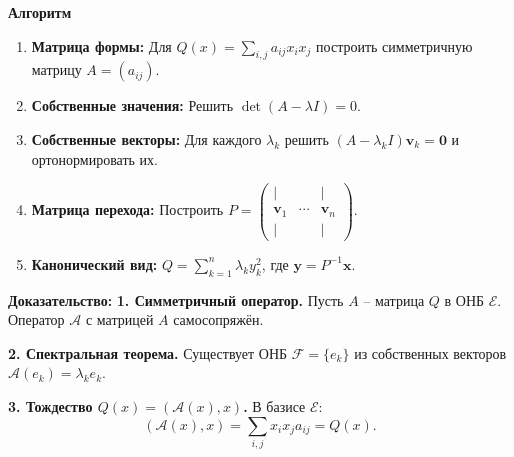 \documentclass[12pt]{article}
\begin{document}
\textbf{Алгоритм}
\begin{enumerate}
  \item \textbf{Матрица формы:} Для $Q(x) = \sum_{i,j} a_{ij}x_i x_j$ построить симметричную матрицу $A = (a_{ij})$.
  \item \textbf{Собственные значения:} Решить $\det(A - \lambda I) = 0$.
  \item \textbf{Собственные векторы:} Для каждого $\lambda_k$ решить $(A - \lambda_k I)\mathbf{v}_k = \mathbf{0}$ и ортонормировать их.
  \item \textbf{Матрица перехода:} Построить $P = \begin{pmatrix} | & & | \\ \mathbf{v}_1 & \cdots & \mathbf{v}_n \\ | & & | \end{pmatrix}$.
  \item \textbf{Канонический вид:} $Q = \sum_{k=1}^n \lambda_k y_k^2$, где $\mathbf{y} = P^{-1}\mathbf{x}$.
\end{enumerate}

\textbf{Доказательство:}\newline
\textbf{1. Симметричный оператор.} 
Пусть $A$ -- матрица $Q$ в ОНБ $\mathcal{E}$. Оператор $\mathcal{A}$ с матрицей $A$ самосопряжён.

\textbf{2. Спектральная теорема.} 
Существует ОНБ $\mathcal{F} = \{e_k\}$ из собственных векторов $\mathcal{A}(e_k) = \lambda_k e_k$.

\textbf{3. Тождество $Q(x) = (\mathcal{A}(x), x)$.} 
В базисе $\mathcal{E}$:
\[
(\mathcal{A}(x), x) = \sum_{i,j} x_i x_j a_{ij} = Q(x).
\]
\end{document}
